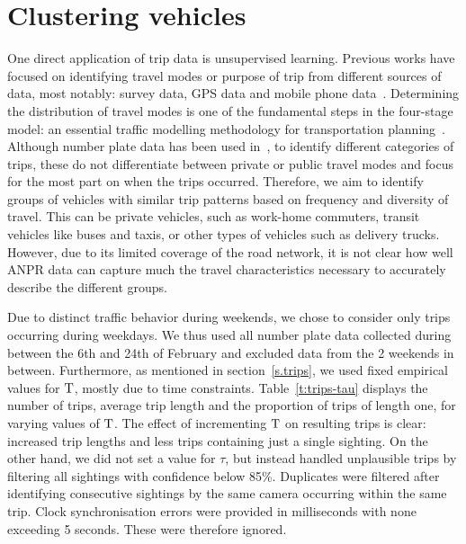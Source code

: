 \section{Clustering vehicles}\label{s.classification}

One direct application of trip data is unsupervised learning. Previous works have focused on identifying travel modes or purpose of trip from different sources of data, most notably: survey data, GPS data and mobile phone data~\cite{ODMobileData, ClusteringGPS}. Determining the distribution of travel modes is one of the fundamental steps in the four-stage model: an essential traffic modelling methodology for transportation planning~\cite{FourStepModel}. Although number plate data has been used in~\cite{Clustering}, to identify different categories of trips, these do not differentiate between private or public travel modes and focus for the most part on when the trips occurred. Therefore, we aim to identify groups of vehicles with similar trip patterns based on frequency and diversity of travel. This can be private vehicles, such as work-home commuters, transit vehicles like buses and taxis, or other types of vehicles such as delivery trucks.
However, due to its limited coverage of the road network, it is not clear how well ANPR data can capture much the travel characteristics necessary to accurately describe the different groups.

Due to distinct traffic behavior during weekends, we chose to consider only trips occurring during weekdays. We thus used all number plate data collected during between the 6th and 24th of February and excluded data from the 2 weekends in between. Furthermore, as mentioned in section~\ref{s.trips}, we used fixed empirical values for $\mathrm{T}$, mostly due to time constraints. Table~\ref{t:trips-tau} displays the number of trips, average trip length and the proportion of trips of length one, for varying values of $\mathrm{T}$. The effect of incrementing $\mathrm{T}$ on resulting trips is clear: increased trip lengths and less trips containing just a single sighting. On the other hand, we did not set a value for $\tau$, but instead handled unplausible trips by filtering all sightings with confidence below 85\%. Duplicates were filtered after identifying consecutive sightings by the same camera occurring within the same trip. Clock synchronisation errors were provided in milliseconds with none exceeding 5 seconds. These were therefore ignored.

